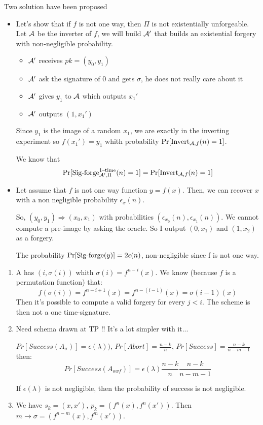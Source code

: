 \newape
\begin{solution}
  Two solution have been proposed
  \begin{itemize}
    \item
      Let's show that if $f$ is not one way, then $\Pi$ is not existentially unforgeable.
      Let $\mathcal{A}$ be the inverter of $f$, we will build $\mathcal{A}'$ that builds an existential forgery with non-negligible probability.

      \begin{itemize}
        \item $\mathcal{A}'$ receives $pk = (y_0, y_1)$
        \item $\mathcal{A}'$ ask the signature of 0 and gets $\sigma$, he does not really care about it
        \item $\mathcal{A}'$ gives $y_1$ to $\mathcal{A}$ which outputs $x_1'$
        \item $\mathcal{A}'$ outputs $(1, x_1')$
      \end{itemize}
      Since $y_1$ is the image of a random $x_1$, we are exactly in the inverting experiment so $f(x_1') = y_1$
      whith probability $\Pr[\operatorname{Invert}_{\mathcal{A},f}(n) = 1]$.

      We know that
      \[
        \Pr[\operatorname{Sig-forge}^{\text{1--time}}_{\mathcal{A}',\Pi}(n) = 1] = \Pr[\operatorname{Invert}_{\mathcal{A},f}(n) = 1]
      \]
    \item
      Let assume that $f$ is not one way function $y = f(x)$.
      Then, we can recover $x$ with a non negligible probability $\epsilon_x (n)$.

      So, $(y_0, y_1) \Rightarrow (x_0, x_1)$ with probabilities $(\epsilon_{x_0} (n), \epsilon_{x_1} (n))$.
      We cannot compute a pre-image by asking the oracle. So I output $(0, x_1)$ and $(1, x_2)$ as a forgery.

      The probability $\Pr[\operatorname{Sig-forge}(y)] = 2\epsilon(n)$, non-negligible since f is not one way.
  \end{itemize}
\end{solution}
\begin{solution}
  \begin{enumerate}
    \item
      A has $(i, \sigma(i))$ whith $\sigma (i) = f^{n-i} (x)$. We know (because $f$ is a permutation function) that:
      $$f(\sigma(i)) = f^{n-i+1}(x) = f^{n-(i-1)}(x) = \sigma(i-1)(x)$$
      Then it's possible to compute a valid forgery for every $j < i$. The scheme is then not a one time-signature.
    \item
      Need schema drawn at TP !! It's a lot simpler with it...

      $Pr[Success (A_\sigma)] = \epsilon(\lambda))$, $Pr[Abort] = \frac{n-k}{n}$, $Pr[Success] = \frac{n-k}{n-m-1}$ then:
      $$ Pr[Success(A_{owf})] = \epsilon(\lambda) \frac{n-k}{n} \frac{n-k}{n-m-1}$$

      If $\epsilon(\lambda)$ is not negligible, then the probability of success is not negligible.
    \item
      We have $s_k = (x, x')$, $p_k = (f^n(x), f^n(x'))$.
      Then $m \rightarrow \sigma = (f^{n-m}(x), f^m(x'))$.

  \end{enumerate}
\end{solution}
